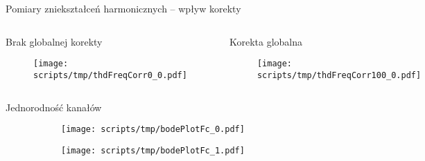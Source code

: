 \begin{frame}{Pomiary zniekształceń harmonicznych -- wpływ korekty}

    \begin{columns}

        \begin{block}{Brak globalnej korekty}
            \begin{figure}[H]
                \centering
                \texttt{[image: scripts/tmp/thdFreqCorr0\_0.pdf]} 
            \end{figure}   
        \end{block}


        \begin{block}{Korekta globalna}
            \begin{figure}[H]
                \centering
                \texttt{[image: scripts/tmp/thdFreqCorr100\_0.pdf]}
            \end{figure}   
        \end{block}
    \end{columns}

\end{frame}

\begin{frame}{Jednorodność kanałów}
    \begin{figure}[H]
        \centering
        \begin{subfigure}[b]{0.485\textwidth}
            \centering
            \texttt{[image: scripts/tmp/bodePlotFc\_0.pdf]}

        \end{subfigure}
        \begin{subfigure}[b]{0.485\textwidth}
            \centering
            \texttt{[image: scripts/tmp/bodePlotFc\_1.pdf]}

        \end{subfigure}     
    \end{figure}
\end{frame}